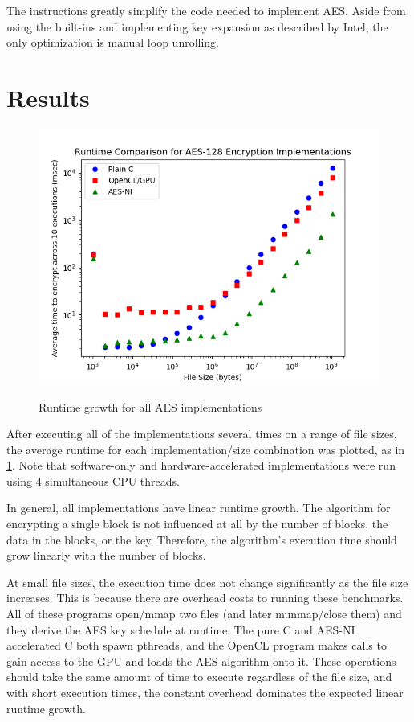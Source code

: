 \documentclass[a4paper,10pt,conference]{IEEEtran}
\begin{document}
The instructions greatly simplify the code needed to implement AES.  Aside from using the built-ins and implementing key expansion as described by Intel, the only optimization is manual loop unrolling.

\section{Results}

\begin{figure}[!t]
 \includegraphics{results.png}
 \label{plot}
 \caption{Runtime growth for all AES implementations}
\end{figure}

After executing all of the implementations several times on a range of file sizes, the average runtime for each implementation/size combination was plotted, as in \ref{plot}.  Note that software-only and hardware-accelerated implementations were run using 4 simultaneous CPU threads.

In general, all implementations have linear runtime growth.  The algorithm for encrypting a single block is not influenced at all by the number of blocks, the data in the blocks, or the key.  Therefore, the algorithm's execution time should grow linearly with the number of blocks.

At small file sizes, the execution time does not change significantly as the file size increases.  This is because there are overhead costs to running these benchmarks.  All of these programs open/mmap two files (and later munmap/close them) and they derive the AES key schedule at runtime.  The pure C and AES-NI accelerated C both spawn pthreads, and the OpenCL program makes calls to gain access to the GPU and loads the AES algorithm onto it.  These operations should take the same amount of time to execute regardless of the file size, and with short execution times, the constant overhead dominates the expected linear runtime growth.
\end{document}
